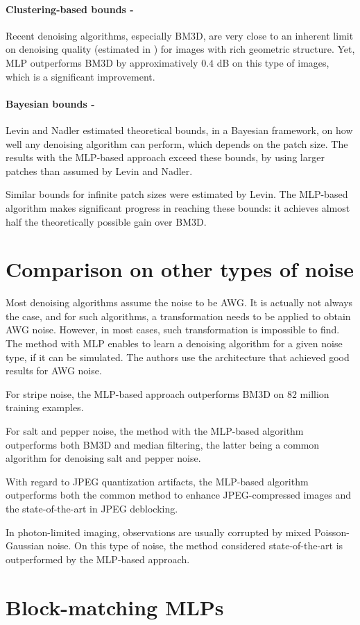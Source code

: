 \documentclass[10pt,a4paper]{article}
\newcommand{\ourparagraph}[1]{\paragraph{#1}}
\begin{document}
\ourparagraph{Clustering-based bounds -}{Recent denoising algorithms, especially BM3D, are very close to an inherent limit on denoising quality (estimated in \citep{deaddenoise}) for images with rich geometric structure. Yet, MLP outperforms BM3D by approximatively $0.4$ dB on this type of images, which is a significant improvement.


\ourparagraph{Bayesian bounds -}{Levin and Nadler \citep{Levin2011NaturalID} estimated theoretical bounds, in a Bayesian framework, on how well any denoising algorithm can perform, which depends on the patch size. The results with the MLP-based approach exceed these bounds, by using larger patches than assumed by Levin and Nadler.

Similar bounds for infinite patch sizes were estimated by Levin. The MLP-based algorithm makes significant progress in reaching these bounds: it achieves almost half the theoretically possible gain over BM3D.}

\section{Comparison on other types of noise}

Most denoising algorithms assume the noise to be AWG. It is actually not always the case, and for such algorithms, a transformation needs to be applied to obtain AWG noise. However, in most cases, such transformation is impossible to find. The method with MLP enables to learn a denoising algorithm for a given noise type, if it can be simulated. The authors use the architecture that achieved good results for AWG noise.

For stripe noise, the MLP-based approach outperforms BM3D on $82$ million training examples.

For salt and pepper noise, the method with the MLP-based algorithm outperforms both BM3D and median filtering, the latter being a common algorithm for denoising salt and pepper noise.

With regard to JPEG quantization artifacts, the MLP-based algorithm outperforms both the common method to enhance JPEG-compressed images and the state-of-the-art in JPEG deblocking.

In photon-limited imaging, observations are usually corrupted by mixed Poisson-Gaussian noise. On this type of noise, the method considered state-of-the-art is outperformed by the MLP-based approach.


\section{Block-matching MLPs}

}
\end{document}
